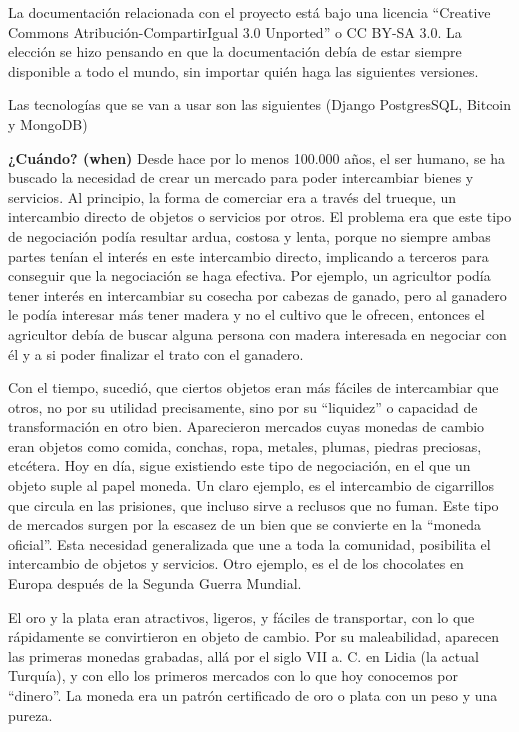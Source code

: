 \documentclass[a4paper, 12pt]{book}
\begin{document}
La documentación relacionada con el proyecto está bajo una licencia 
``Creative Commons Atribución-CompartirIgual 3.0 Unported'' o CC BY-SA 3.0. 
La elección se hizo pensando en que la documentación debía de estar siempre 
disponible a todo el mundo, sin importar quién haga las siguientes versiones.

Las tecnologías que se van a usar son las siguientes (Django PostgresSQL, Bitcoin y MongoDB)


\textbf{¿Cuándo? (when)}
Desde hace por lo menos 100.000 años, el ser humano, se ha buscado la necesidad 
de crear un mercado para poder intercambiar bienes y servicios. Al principio, 
la forma de comerciar era a través del trueque, un intercambio directo de 
objetos o servicios por otros. El problema era que este tipo de negociación 
podía resultar ardua, costosa y lenta, porque no siempre ambas partes tenían el 
interés en este intercambio directo, implicando a terceros para conseguir que 
la negociación se haga efectiva. Por ejemplo, un agricultor podía tener interés 
en intercambiar su cosecha por cabezas de ganado, pero al ganadero le podía 
interesar más tener madera y no el cultivo que le ofrecen, entonces el 
agricultor debía de buscar alguna persona con madera interesada en negociar 
con él y a si poder finalizar el trato con el ganadero.

Con el tiempo, sucedió, que ciertos objetos eran más fáciles de intercambiar que 
otros, no por su utilidad precisamente, sino por su ``liquidez'' o capacidad de 
transformación en otro bien.  Aparecieron mercados cuyas monedas de cambio eran 
objetos como comida, conchas, ropa, metales, plumas, piedras preciosas, 
etcétera. Hoy en día, sigue existiendo este tipo de negociación, en el que un 
objeto suple al papel moneda. Un claro ejemplo, es el intercambio de cigarrillos 
que circula en las prisiones, que incluso sirve a reclusos que no fuman. Este 
tipo de mercados surgen por la escasez de un bien que se convierte en la 
``moneda oficial''. Esta necesidad generalizada que une a toda la comunidad, 
posibilita el intercambio de objetos y servicios. Otro ejemplo, es el de los 
chocolates en Europa después de la Segunda Guerra Mundial.

El oro y la plata eran atractivos, ligeros, y fáciles de transportar, con lo 
que rápidamente se convirtieron en objeto de cambio. Por su maleabilidad, 
aparecen las primeras monedas grabadas, allá por el siglo VII a. C. en Lidia 
(la actual Turquía), y con ello los primeros mercados con lo que hoy conocemos 
por ``dinero''. La moneda era un patrón certificado de oro o plata con un peso 
y una pureza.
\end{document}
